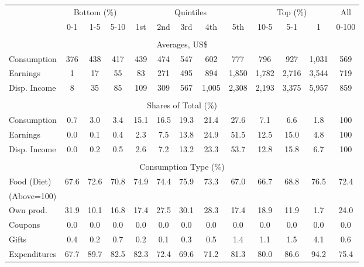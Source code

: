 \begin{tabular}{l c c c| c c c c c| c c c| c}
\toprule
&\multicolumn{3}{c|}{Bottom (\%)} & \multicolumn{5}{c|}{Quintiles} & \multicolumn{3}{c|}{Top (\%)} & All  \\
& 0-1 & 1-5 & 5-10 &  1st & 2nd & 3rd & 4th & 5th & 10-5 & 5-1 & 1 & 0-100 \\
\midrule \\
\multicolumn{13}{c}{Averages, US\$} \\
\midrule
Consumption  & 376  & 438  & 417  & 439  & 474  & 547  & 602  & 777  & 796  & 927  & 1,031  & 569 \\
Earnings         & 1 & 17 & 55 & 83 & 271 & 495 & 894 & 1,850 & 1,782 & 2,716 & 3,544 & 719 \\
Disp. Income & 8 & 35 & 85 & 109 & 309 & 567 & 1,005 & 2,308 & 2,193 & 3,375 & 5,957 & 859 \\
\midrule \\
\multicolumn{13}{c}{Shares of Total (\%)} \\
\midrule
Consumption  & 0.7   & 3.0   & 3.4   & 15.1   & 16.5   & 19.3   & 21.4   & 27.6   & 7.1   & 6.6   & 1.8   & 100 \\
Earnings         & 0.0  & 0.1  & 0.4  & 2.3  & 7.5  & 13.8  & 24.9  & 51.5  & 12.5  & 15.0  & 4.8  & 100 \\
Disp. Income & 0.0  & 0.2  & 0.5  & 2.6  & 7.2  & 13.2  & 23.3  & 53.7  & 12.8  & 15.8  & 6.7  & 100 \\
\midrule \\
\multicolumn{13}{c}{Consumption Type (\%)}  \\
\midrule
Food (Diet)  & 67.6 & 72.6 & 70.8 & 74.9 & 74.4 & 75.9 & 73.3 & 67.0 & 66.7 & 68.8 & 76.5 & 72.4 \\
(Above=100) & & & & & & & & & & & &  \\
\hspace{.3cm} Own prod.  & 31.9 & 10.1 & 16.8 & 17.4 & 27.5 & 30.1 & 28.3 & 17.4 & 18.9 & 11.9 & 1.7 & 24.0 \\
\hspace{.3cm} Coupons    & 0.0 & 0.0 & 0.0 & 0.0 & 0.0 & 0.0 & 0.0 & 0.0 & 0.0 & 0.0 & 0.0 & 0.0 \\
\hspace{.3cm} Gifts      & 0.4 & 0.2 & 0.7 & 0.2 & 0.1 & 0.3 & 0.5 & 1.4 & 1.1 & 1.5 & 4.1 & 0.6 \\
\hspace{.3cm} Expenditures  & 67.7 & 89.7 & 82.5 & 82.3 & 72.4 & 69.6 & 71.2 & 81.3 & 80.0 & 86.6 & 94.2 & 75.4 \\

\end{tabular}

